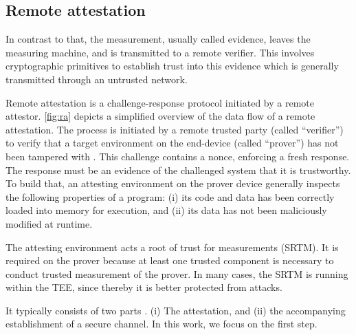 
\subsection{Remote attestation}




In contrast to that, the measurement, usually called evidence, leaves the measuring machine, and is transmitted to a remote verifier. This involves cryptographic primitives to establish trust into this evidence which is generally transmitted through an untrusted network.

Remote attestation is a challenge-response protocol initiated by a remote attestor. \autoref{fig:ra} depicts a simplified overview of the data flow of a remote attestation.
The process is initiated by a remote trusted party (called ``verifier'') to verify that a target environment on the end-device (called ``prover'') has not been tampered with \cite{Menetrey2022, Coker2011}. This challenge contains a nonce, enforcing a fresh response.
The response must be an evidence of the challenged system that it is trustworthy. To build that, an attesting environment on the prover device generally inspects the following properties of a program: (i) its code and data has been correctly loaded into memory for execution, and (ii) its data has not been maliciously modified at runtime.

The attesting environment acts a root of trust for measurements (SRTM).
It is required on the prover because at least one trusted component is necessary to conduct trusted measurement of the prover. In many cases, the SRTM is running within the TEE, since thereby it is better protected from attacks.

It typically consists of two parts \cite{McCune2008}. (i) The attestation, and (ii) the accompanying establishment of a secure channel. In this work, we focus on the first step.

